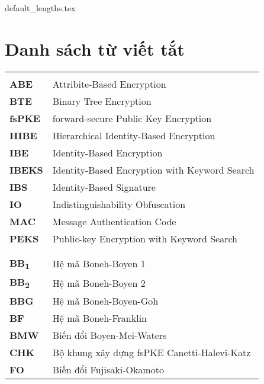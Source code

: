 \documentclass[class=report, crop=false]{standalone}
\begin{document}
	{default_lengths.tex}
	\baselineskip
	\chapter*{Danh sách từ viết tắt}
	\begin{longtabu}{>{\large\bfseries}p{3.2cm} >{\large}X[l]}
		 \\
		ABE						&	Attribite-Based Encryption 															\\
		BTE						&	Binary Tree Encryption 																\\
		fsPKE					&	forward-secure Public Key Encryption 												\\
		HIBE					&	Hierarchical Identity-Based Encryption 												\\
		IBE						&	Identity-Based Encryption 															\\
		IBEKS					&	Identity-Based Encryption with Keyword Search 										\\
		IBS						&	Identity-Based Signature 															\\
		IO						&	Indistinguishability Obfuscation 													\\
		MAC						&	Message Authentication Code 														\\
		PEKS					&	Public-key Encryption with Keyword Search											\\
		\\  \\
		BB\textsubscript{1}		& 	Hệ mã Boneh-Boyen 1 \cite{DBLP:journals/joc/BonehB11} 								\\
		BB\textsubscript{2}		& 	Hệ mã Boneh-Boyen 2 \cite{DBLP:journals/joc/BonehB11}								\\
		BBG						& 	Hệ mã Boneh-Boyen-Goh \cite{DBLP:conf/eurocrypt/BonehBG05} 							\\
		BF 						& 	Hệ mã Boneh-Franklin \cite{DBLP:conf/crypto/BonehF01} 								\\
		BMW 					& 	Biến đổi Boyen-Mei-Waters \cite{DBLP:conf/ccs/BoyenMW05} 							\\
		CHK 					& 	Bộ khung xây dựng fsPKE Canetti-Halevi-Katz \cite{DBLP:conf/eurocrypt/CanettiHK03} 	\\
		FO 						& 	Biến đổi Fujisaki-Okamoto \cite{DBLP:conf/crypto/FujisakiO99} 						\\

\end{longtabu}
\end{document}
